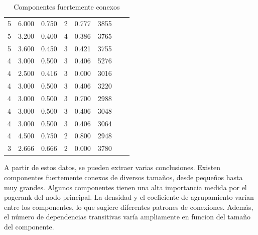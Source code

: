 \begin{table}
\begin{tabular}{|c|c|c|c|c|c|c|c|}
        5             & 6.000           & 0.750            & 2                 & 0.777                & 3855                  \\
        5             & 3.200           & 0.400            & 4                 & 0.386                & 3765                  \\
        5             & 3.600           & 0.450            & 3                 & 0.421                & 3755                  \\
        4             & 3.000           & 0.500            & 3                 & 0.406                & 5276                  \\
        4             & 2.500           & 0.416            & 3                 & 0.000                & 3016                  \\
        4             & 3.000           & 0.500            & 3                 & 0.406                & 3220                  \\
        4             & 3.000           & 0.500            & 3                 & 0.700                & 2988                  \\
        4             & 3.000           & 0.500            & 3                 & 0.406                & 3048                  \\
        4             & 3.000           & 0.500            & 3                 & 0.406                & 3064                  \\
        4             & 4.500           & 0.750            & 2                 & 0.800                & 2948                  \\
        3             & 2.666           & 0.666            & 2                 & 0.000                & 3780                  \\
        \hline
    \end{tabular}
    \caption{Componentes fuertemente conexos}
    \label{table:scc}
\end{table}

A partir de estos datos, se pueden extraer varias conclusiones. Existen componentes fuertemente conexos de diversos
tamaños, desde pequeños hasta muy grandes. Algunos componentes tienen una alta importancia medida por el pagerank
del nodo principal. La densidad y el coeficiente de agrupamiento varían entre los componentes, lo que sugiere diferentes
patrones de conexiones. Además, el número de dependencias transitivas varía ampliamente en funcion del tamaño del componente.

